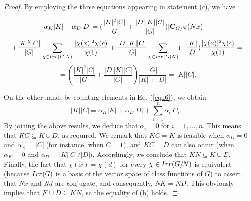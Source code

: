 \documentclass[10pt,a4paper]{amsart}
\begin{document}
\begin{proof}
\noindent
By employing the  three equations appearing in statement (c), we have

  $$ \alpha_K|K| + \alpha_D|D|= (\frac{|K|^2|C|}{|G|} +
  \frac{|D||K||C|}{|G|})|{\bf C}_{G/N}(Nx)| +$$
 $$+ \frac{|K|^2|C|}{|G|}\sum_{\chi\in {\rm Irr}(G|N)}\frac{|\chi(x)|^2\chi(c)}{\chi(1)} +\frac{|D||K||C|}{|G|}
  \sum_{\chi\in {\rm Irr}(G|N)}(-\frac{|K|}{|D|})\frac{|\chi(x)|^2\chi(c)}{\chi(1)}=$$
$$=( \frac{|K|^2|C|}{|G|} +
  \frac{|D||K||C|}{|G|})\frac{|G|}{|K|+|D|}=|K||C|.$$
  
 On the other hand,  by counting elements in Eq. (\ref{eqn6}), we obtain
 $$|K||C|=\alpha_K|K|+ \alpha_D|D| + \sum_{i=1}^n\alpha_i|C_i|.$$
By joining the above results, we deduce that $\alpha_i=0$ for  $i=1,\ldots , n$. This means that $KC\subseteq K\cup D$, as required. We remark that $KC=K$ is feasible when $\alpha_D=0$ and $\alpha_K=|C|$ (for instance, when $C=1$),  and $KC=D$ can also occur (when $\alpha_K=0$ and $\alpha_D=|K||C|/|D|)$.
Accordingly, we conclude that $KN\subseteq K \cup D$. Finally, the fact that $\chi(x)=\chi(d)$ for every $\chi\in {\rm Irr}(G/N)$  is equivalent (because ${\rm Irr}(G)$ is a basis of the vector space of class functions of $G$) to assert that $Nx$ and $Nd$ are conjugate, and consequently, $NK=ND$. This obviously implies that $K\cup D\subseteq KN$, so the equality of (b) holds.
\end{proof}
\end{document}
